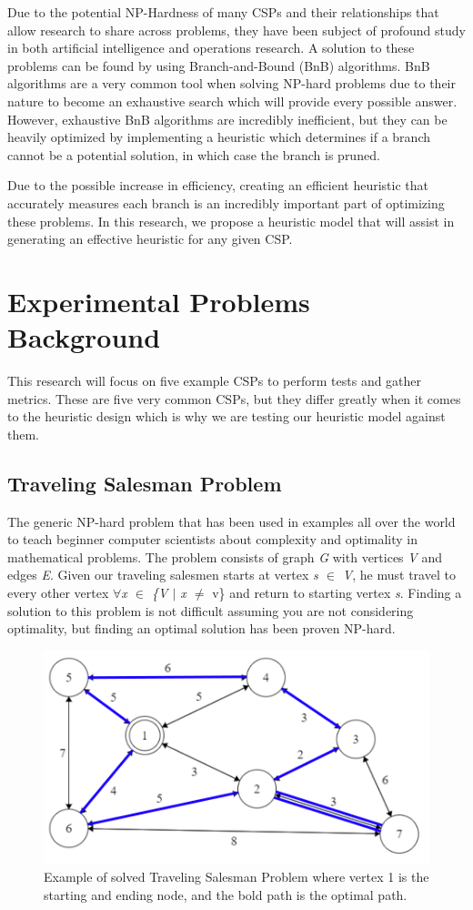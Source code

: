 \documentclass[10pt,twoside]{IEEEtran}
\begin{document}
Due to the potential NP-Hardness of many CSPs and their relationships that allow research to share across problems, they have been subject of profound study in both artificial intelligence and operations research. A solution to these problems can be found by using Branch-and-Bound (BnB) algorithms. BnB algorithms are a very common tool when solving NP-hard problems due to their nature to become an exhaustive search which will provide every possible answer. However, exhaustive BnB algorithms are incredibly inefficient, but they can be heavily optimized by implementing a heuristic which determines if a branch cannot be a potential solution, in which case the branch is pruned. 

Due to the possible increase in efficiency, creating an efficient heuristic that accurately measures each branch is an incredibly important part of optimizing these problems. In this research, we propose a heuristic model that will assist in generating an effective heuristic for any given CSP.

\section{Experimental Problems Background}
This research will focus on five example CSPs to perform tests and gather metrics. These are five very common CSPs, but they differ greatly when it comes to the heuristic design which is why we are testing our heuristic model against them.
\subsection{Traveling Salesman Problem}
The generic NP-hard problem that has been used in examples all over the world to teach beginner computer scientists about complexity and optimality in mathematical problems. The problem consists of graph \emph{G} with vertices \emph{V} and edges \emph{E}. Given our traveling salesmen starts at vertex \emph{s ${\in}$ V}, he must travel to every other vertex \emph{${\forall}$x ${\in}$ \{V ${\mid}$ x ${\neq}$} v\} and return to starting vertex \emph{s}. Finding a solution to this problem is not difficult assuming you are not considering optimality, but finding an optimal solution has been proven NP-hard.

\begin{figure}[h]
	\centering
	\includegraphics[width=0.9\linewidth]{../diagrams/tsp.png}
	\caption{Example of solved Traveling Salesman Problem where vertex 1 is the starting and ending node, and the bold path is the optimal path.}
	\label{TSP fig}
\end{figure}
\end{document}
